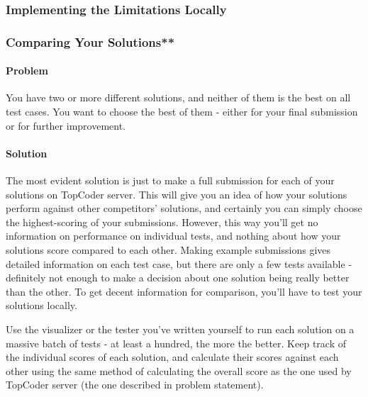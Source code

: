 \hypertarget{implementing-the-limitations-locally}{%
\subsubsection{Implementing the Limitations
Locally}\label{implementing-the-limitations-locally}}

\hypertarget{comparing-your-solutions}{%
\subsubsection{Comparing Your
Solutions**}\label{comparing-your-solutions}}

\hypertarget{problem-3}{%
\paragraph{Problem}\label{problem-3}}

You have two or more different solutions, and neither of them is the
best on all test cases. You want to choose the best of them - either for
your final submission or for further improvement.

\hypertarget{solution-3}{%
\paragraph{Solution}\label{solution-3}}

The most evident solution is just to make a full submission for each of
your solutions on TopCoder server. This will give you an idea of how
your solutions perform against other competitors' solutions, and
certainly you can simply choose the highest-scoring of your submissions.
However, this way you'll get no information on performance on individual
tests, and nothing about how your solutions score compared to each
other. Making example submissions gives detailed information on each
test case, but there are only a few tests available - definitely not
enough to make a decision about one solution being really better than
the other. To get decent information for comparison, you'll have to test
your solutions locally.

Use the visualizer or the tester you've written yourself to run each
solution on a massive batch of tests - at least a hundred, the more the
better. Keep track of the individual scores of each solution, and
calculate their scores against each other using the same method of
calculating the overall score as the one used by TopCoder server (the
one described in problem statement).

